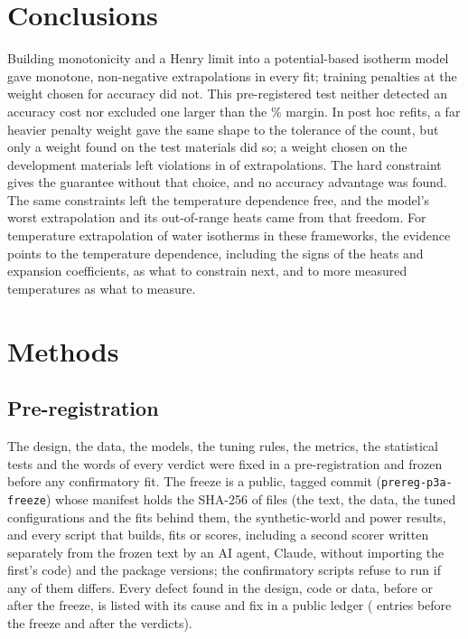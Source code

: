 \documentclass[journal=jcisd8,manuscript=article]{achemso}
\begin{document}
\section*{Conclusions}

Building monotonicity and a Henry limit into a potential-based isotherm model gave monotone, non-negative
extrapolations in every fit; training penalties at the weight chosen for accuracy did not. This pre-registered test
neither detected an accuracy cost nor excluded one larger than the \% margin. In post hoc refits, a
far heavier penalty weight gave the same shape to the tolerance of the count, but only a weight found on the test
materials did so; a weight chosen on the development materials left violations in  of
 extrapolations. The hard constraint gives the guarantee without that choice, and no accuracy
advantage was found. The same constraints left the temperature dependence free, and the model's worst extrapolation
and its out-of-range heats came from that freedom. For temperature extrapolation of water isotherms in these
frameworks, the evidence points to the temperature dependence, including the signs of the heats and expansion
coefficients, as what to constrain next, and to more measured temperatures as what to measure.

\section*{Methods}

\subsection*{Pre-registration}

The design, the data, the models, the tuning rules, the metrics, the statistical tests and the words of every
verdict were fixed in a pre-registration and frozen before any confirmatory fit. The freeze is a public, tagged
commit (\texttt{prereg-p3a-freeze}) whose manifest holds the SHA-256 of  files (the text, the data,
the tuned configurations and the fits behind them, the synthetic-world and power results, and every script that
builds, fits or scores, including a second scorer written separately from the frozen text by an AI agent, Claude, without importing the
first's code) and the package versions; the
confirmatory scripts refuse to run if any of them differs. Every defect found in the design, code or data, before or
after the freeze, is listed with its cause and fix in a public ledger ( entries before the
freeze and  after the verdicts).
\end{document}
